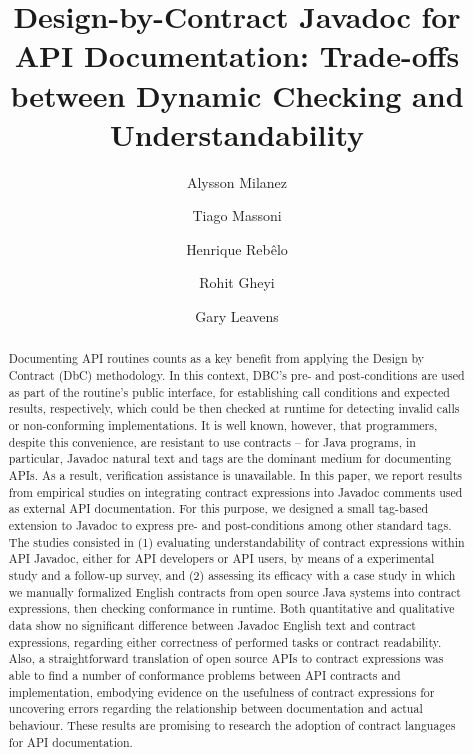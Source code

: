 \documentclass[a4paper,UKenglish]{lipics-v2018}
\title{Design-by-Contract Javadoc for API Documentation: Trade-offs between Dynamic Checking and Understandability}
\author{Alysson Milanez}{Department of Systems and Computing, UFCG, Brazil}{alyssonfilgueira@copin.ufcg.edu.br}{}{}
\author{Tiago Massoni}{Department of Systems and Computing, UFCG, Brazil}{massoni@dsc.ufcg.edu.br}{}{}
\author{Henrique Reb\^{e}lo}{Informatics Center, UFPE, Brazil}{hemr@cin.ufpe.br}{}{}
\author{Rohit Gheyi}{Department of Systems and Computing, UFCG, Brazil}{rohit@dsc.ufcg.edu.br}{}{}
\author{Gary Leavens}{Department of Computer Science, UCF, USA}{leavens@cs.ucf.edu}{}{}
\newcommand{\contractjdoc}[1]{\textsc{ContractJDoc}}
\begin{document}
\maketitle

\begin{abstract}
Documenting API routines counts as a key benefit from applying the Design by Contract (DbC) methodology. 
In this context, DBC's pre- and post-conditions are used as part of the routine's public interface, for establishing call conditions and expected results, respectively, which could be then checked at runtime for detecting invalid calls or non-conforming implementations.
%
It is well known, however, that programmers, despite this convenience, are resistant to use contracts -- for Java programs, in particular, Javadoc natural text and tags are the dominant medium for documenting APIs. 
As a result, verification assistance is unavailable.
%
In this paper, we report results from empirical studies on integrating contract expressions into Javadoc comments used as external API documentation. 
For this purpose, we designed a small tag-based extension to Javadoc to express pre- and post-conditions among other standard tags.
%
The studies consisted in (1) evaluating understandability of contract expressions within API Javadoc, either for API developers or API users, by means of a experimental study and a follow-up survey, and (2) assessing its efficacy with a case study in which we manually formalized English contracts from open source Java systems into contract expressions, then checking conformance in runtime.    
%
Both quantitative and qualitative data show no significant difference between Javadoc English text and contract expressions, regarding either correctness of performed tasks or contract readability. 
Also, a straightforward translation of open source APIs to contract expressions was able to find a number of conformance problems between API contracts and implementation, embodying evidence on the usefulness of contract expressions for uncovering errors regarding the relationship between documentation and actual behaviour.
%
These results are promising to research the adoption of contract languages for API documentation.
\end{abstract}














\end{document}
